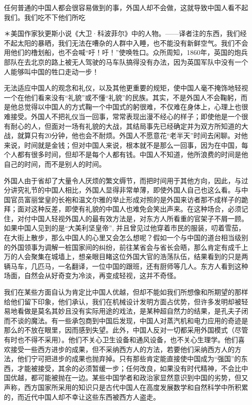 \documentclass[12pt,oneside]{book}
\begin{document}
\begin{common-format}
任何普通的中国人都会很容易做到的事，外国人却不会做，这就导致中国人看不起我们。我们吃不下他们所吃 

＊美国作家狄更斯小说《大卫·科波菲尔》中的人物。——译者注的东西，我们经不起太阳的暴晒，我们无法在嘈杂的人群中入睡，也不能没有新鲜空气。我们不会用他们的橹划船，也不会喊“吁！吁！”使唤牲口。众所周知，1860年，英国的炮兵部队在去北京的路上被无人驾驶的马车队搞得没有办法，因为英国军队中没有一个人能够叫中国的牲口走动一步！ 

无法适应中国人的观念和礼仪，以及其他更重要的规矩，使中国人毫不掩饰地轻视一个在他们看来没有“礼貌”或不懂“礼貌”的民族。其实，不是外国人不会鞠躬，而是他总觉得以中国人的方式鞠一个中国式的躬很难，不仅难在身体上，心理上也很难接受。外国人不把礼仪当一回事，常常表现出漫不经心的样子；即使他是一个很有耐心的人，但面对一场有礼貌的大战，其结局事先已经确定并为双方所知道的大战，就算只有20分钟，他也会不耐烦。外国人不愿意花“老半天”时间去闲聊。对他来说，时间就是金钱；但对中国人来说，根本就不是那么一回事，因为在中国，每个人都有很多时间，但却不是每个人都有钱。中国人不知道，他所浪费的时间是他自己的时间，而不是别人的时间。 

外国人由于省却了大量令人厌烦的繁文缛节，而把时间用于其他方向，因此，与过分讲究礼节的中国人相比，外国人显得非常单薄，即使外国人自己也这么看。与中国官员富丽堂皇的长袍和温文尔雅的举止形成对照的是外国来访者那不成样子的跪拜；面对这种反差，即使有礼貌的中国人也难免会笑出声来。在这种场合，必须记住，对付中国人轻视外国人的最有效方法是，对东方人所看重的官架子不屑一顾。如果中国人见到的是“大美利坚皇帝”, 并且曾见过他穿着市民的服装，叨着雪茄，在大街上散步，那么中国人的心里又会怎么想呢？假如一个与中国的道台相当级别的外国领事为调解一桩国家间的纠纷，前往某省会与省长会晤，那么肯定有成千上万的人会聚集在城墙上，想亲眼目睹这位外国大官的浩荡队伍，结果看到的只是两辆马车，几匹马，一名翻译，一位中国的跟班，还有厨师等几人。东方人看到这种场面，自然会从好奇变为冷淡，再变成轻视，这并不奇怪。 

我们在某些方面自认为肯定比中国人优越，但却不能如我们所想像和所期望的那样给他们留下印象，他们承认，我们在机械设计发明方面占优势，但许多发明却被轻易地看做是莫名其妙且没有实际用途的戏法，是某种超自然力的结果，是孔夫子闭而不谈的魔法。有一些承包商到中国后发现，中国人对蒸汽机和电力应用的奇迹是那么的不放在眼里，因而感到失望。此外，中国人反对一切都采用外国模式（尽管有时也不得不采用）。他们不关心卫生设备和通风设备，也不关心生理学。他们喜欢接受一些西方进步的成果，但不采纳西方人的方法，若要他们采纳西方人的方法，他们宁可把进步的成果也抛弃掉。只有那些肯定能直接使中国成为“强国”的东西，才能被接受，其余的必须暂缓一步；任何改良，如果没有时代精神，不会比中国优越，都可能被抛在一边。某些中国学者和政治家显然意识到中国的劣势，但又声称，西方国家所采用的知识只是古代中国人在高度发展数学和自然科学中所积累的，而近代中国人却不幸让这些东西被西方人盗走。 


\end{common-format}
\end{document}
